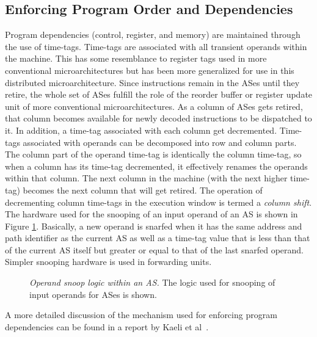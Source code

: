 \documentclass[10pt,twocolumn,dvips]{article}
\begin{document}
\subsection{Enforcing Program Order and Dependencies}
%
Program dependencies (control, register, and memory) are 
maintained through the use of time-tags.
Time-tags are associated with all transient operands within the machine.
This has some resemblance to register tags used in more conventional 
microarchitectures but has been more generalized for use in this
distributed microarchitecture.  
Since instructions remain in the ASes until
they retire, the whole set of ASes
fulfill the role of the reorder buffer or register update unit of more
conventional microarchitectures.
As a column of ASes gets retired, that column becomes available
for newly decoded instructions to be dispatched to it.
In addition, a time-tag associated with each column get decremented.
Time-tags associated with operands can be decomposed into row and 
column parts.  The column part of the operand time-tag is
identically the column time-tag, so when a column has its time-tag
decremented, it effectively renames the operands within that column.
The next column in the machine (with the next higher time-tag)
becomes the next column that will get retired.
The operation of decrementing column time-tags 
in the execution window is termed a \textit{column shift}.
The hardware used for the snooping of an input operand of an AS
is shown in Figure \ref{fig:source}.
Basically, a new operand is snarfed when it has the same address and
path identifier as the current AS as well as
a time-tag value that is less than that of the current AS itself
but greater or equal to that of the last snarfed operand.
Simpler snooping hardware is used in forwarding units.
%
\begin{figure}
\centering
{}
\caption{{\em Operand snoop logic within an AS.}
The logic used for snooping of input operands for ASes is shown.}
\label{fig:source}
\end{figure}
%
A more detailed discussion of the mechanism used for
enforcing program dependencies
can be found in a report by Kaeli et al~\cite{Kaeli01}.
%
%
\end{document}
